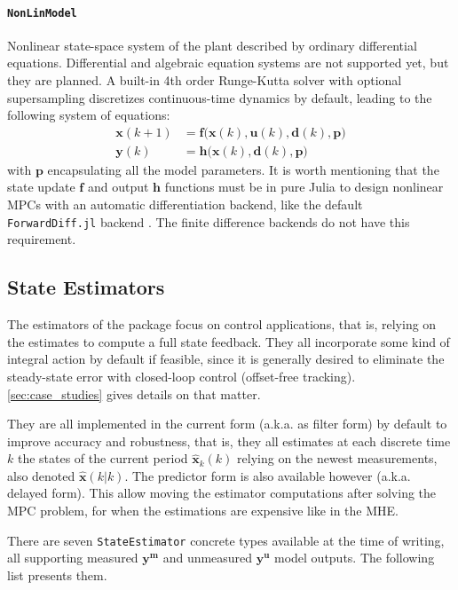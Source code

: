 \paragraph{\textnormal{\texttt{NonLinModel}}}
Nonlinear state-space system of the plant described by ordinary differential equations. Differential and algebraic equation systems are not supported yet, but they are planned. A built-in 4th order Runge-Kutta solver with optional supersampling discretizes continuous-time dynamics by default, leading to the following system of equations:
\begin{subequations}
\begin{align}
    \mathbf{x}(k+1) &= \mathbf{f}\big(\mathbf{x}(k), \mathbf{u}(k), \mathbf{d}(k), \mathbf{p} \big) \\
    \mathbf{y}(k)   &= \mathbf{h}\big( \mathbf{x}(k), \mathbf{d}(k), \mathbf{p} \big)
\end{align}
\end{subequations}
with $\mathbf{p}$ encapsulating all the model parameters. It is worth mentioning that the state update $\mathbf{f}$ and output $\mathbf{h}$ functions must be in pure Julia to design nonlinear MPCs with an automatic differentiation backend, like the default \texttt{ForwardDiff.jl} backend \citep{forwardDiff}. The finite difference backends do not have this requirement.

\subsection{State Estimators}

The estimators of the package focus on control applications, that is, relying on the estimates to compute a full state feedback. They all incorporate some kind of integral action by default if feasible, since it is generally desired to eliminate the steady-state error with closed-loop control (offset-free tracking). \cref{sec:case_studies} gives details on that matter.

They are all implemented in the current form (a.k.a. as filter form) by default to improve accuracy and robustness, that is, they all estimates at each discrete time $k$ the states of the current period $\mathbf{\hat{x}}_k(k)$ relying on the newest measurements, also denoted $\mathbf{\hat{x}}(k|k)$. The predictor form is also available however (a.k.a. delayed form). This allow moving the estimator computations after solving the MPC problem, for when the estimations are expensive like in the MHE.

There are seven \texttt{StateEstimator} concrete types available at the time of writing, all supporting measured $\mathbf{y^m}$ and unmeasured $\mathbf{y^u}$ model outputs. The following list presents them.

